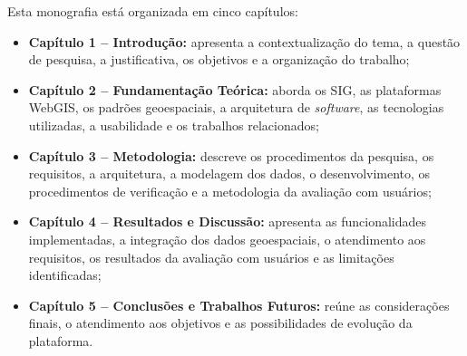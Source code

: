 Esta monografia está organizada em cinco capítulos:

\begin{itemize}

    \item \textbf{Capítulo 1 -- Introdução:} apresenta a contextualização do tema, a questão de pesquisa, a justificativa, os objetivos e a organização do trabalho;

    \item \textbf{Capítulo 2 -- Fundamentação Teórica:} aborda os \gls{SIG}, as plataformas \gls{WebGIS}, os padrões geoespaciais, a arquitetura de \textit{software}, as tecnologias utilizadas, a usabilidade e os trabalhos relacionados;

    \item \textbf{Capítulo 3 -- Metodologia:} descreve os procedimentos da pesquisa, os requisitos, a arquitetura, a modelagem dos dados, o desenvolvimento, os procedimentos de verificação e a metodologia da avaliação com usuários;

    \item \textbf{Capítulo 4 -- Resultados e Discussão:} apresenta as funcionalidades implementadas, a integração dos dados geoespaciais, o atendimento aos requisitos, os resultados da avaliação com usuários e as limitações identificadas;

    \item \textbf{Capítulo 5 -- Conclusões e Trabalhos Futuros:} reúne as considerações finais, o atendimento aos objetivos e as possibilidades de evolução da plataforma.
\end{itemize}